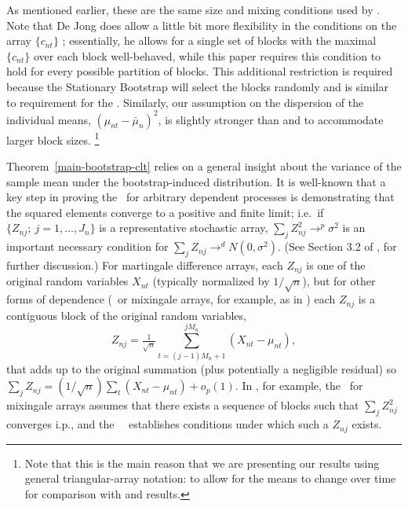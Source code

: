 \documentclass[11pt]{article}
\begin{document}
As mentioned earlier, these are the same size and mixing conditions
used by \citet{Jon:97}.
Note that De Jong does allow a little bit more flexibility in the
conditions on the array $\{c_{nt}\}$ \citep[see also][]{Dav:93};
essentially, he allows for a single set of blocks with the
maximal $\{c_{nt}\}$ over each block well-behaved, while this
paper requires this condition to hold for every possible partition of
blocks.  This additional restriction is required because the
Stationary Bootstrap will select the blocks randomly and is similar to
 requirement for the \fclt. Similarly, our assumption
on the dispersion of the individual means, $(\mu_{nt} - \bar\mu_n)^2$, is
slightly stronger than  and  to
accommodate larger block sizes.%
\footnote{Note that this is the main reason that we are presenting our
  results using general triangular-array notation: to allow for the
  means to change over time for comparison with  and
   results.}

Theorem~\ref{main-bootstrap-clt} relies on a general insight about the
variance of the sample mean under the bootstrap-induced
distribution. It is well-known that a key step in proving the \clt\
for arbitrary dependent processes is demonstrating that the squared
elements converge to a positive and finite limit; i.e.\ if
$\{Z_{nj};~j=1,\dots,J_n\}$ is a representative stochastic array,
$\sum_j Z_{nj}^2 \to^p \sigma^2$ is an important necessary condition
for $\sum_j Z_{nj} \to^d N(0,\sigma^2)$.  (See Section 3.2 of
\citealp{HaH:80}, for further discussion.)  For martingale difference
arrays, each $Z_{nj}$ is one of the original random variables $X_{nt}$
(typically normalized by $1/\sqrt{n}$), but for other forms of
dependence (\ned\ or mixingale arrays, for example, as in
\citealp{Jon:97}) each $Z_{nj}$ is a contiguous block of the original
random variables,
\begin{equation*}
  Z_{nj} = \tfrac{1}{\sqrt{n}} \sum_{t=(j-1) M_n +1}^{j M_n} (X_{nt} - \mu_{nt}),
\end{equation*}
that adds up to the original summation (plus potentially a negligible
residual) so $\sum_j Z_{nj}= (1/\sqrt{n}) \sum_t (X_{nt} - \mu_{nt}) +
o_p(1)$. In \citet{Jon:97}, for example, the \clt\ for mixingale
arrays assumes that there exists a sequence of blocks such that $\sum_j
Z_{nj}^2$ converges i.p., and the \ned\ \clt\ establishes conditions
under which such a $Z_{nj}$ exists.
\end{document}
